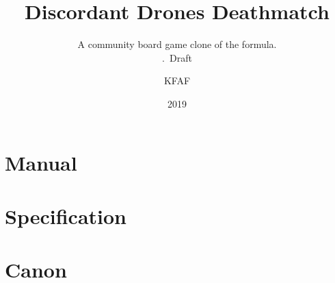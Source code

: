 \documentclass[a4paper]{scrbook}
\title{Discordant Drones Deathmatch}
\subtitle{
    A community board game clone of the \TTT{} formula.\\
    \RNum{3}.\ Draft
}
\author{KFAF}
\date{2019}
\begin{document}
    \maketitle{}

    \frontmatter{}

    \tableofcontents{}
    \listoffigures{}
    \listoftodos{}

    

    \mainmatter{}

    \part{Manual}

    

    

    \part{Specification}

    

    

    

    

    

    

    

    \part{Canon}
\end{document}
